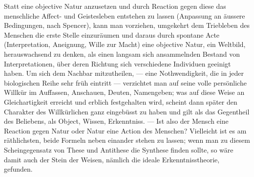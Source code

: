 Statt eine objective Natur anzusetzen und durch Reaction gegen diese das menschliche Affect- und Geistesleben entstehen zu lassen (Anpassung an äussere Bedingungen, nach Spencer), kann man vorziehen, umgekehrt dem Triebleben des Menschen die erste Stelle einzuräumen und daraus durch spontane Acte (Interpretation, Aneignung, Wille zur Macht) eine objective Natur, ein Weltbild, herauswachsend zu denken, als einen langsam sich ansammelnden Bestand von Interpretationen, über deren Richtung sich verschiedene Individuen geeinigt haben. Um sich dem Nachbar mitzutheilen, — eine Nothwendigkeit, die in jeder biologischen Reihe sehr früh eintritt — verzichtet man auf seine volle persönliche Willkür im Auffassen, Anschauen, Deuten, Namengeben; was auf diese Weise an Gleichartigkeit erreicht und erblich festgehalten wird, scheint dann später den Charakter des Willkürlichen ganz eingebüsst zu haben und gilt als das Gegentheil des Beliebens, als Object, Wissen, Erkenntniss. — Ist also der Mensch eine Reaction gegen Natur oder Natur eine Action des Menschen? Vielleicht ist es am räthlichsten, beide Formeln neben einander stehen zu lassen; wenn man zu diesem Scheingegensatz von These und Antithese die Synthese finden sollte, so wäre damit auch der Stein der Weisen, nämlich die ideale Erkenntnisstheorie, gefunden.
\par

